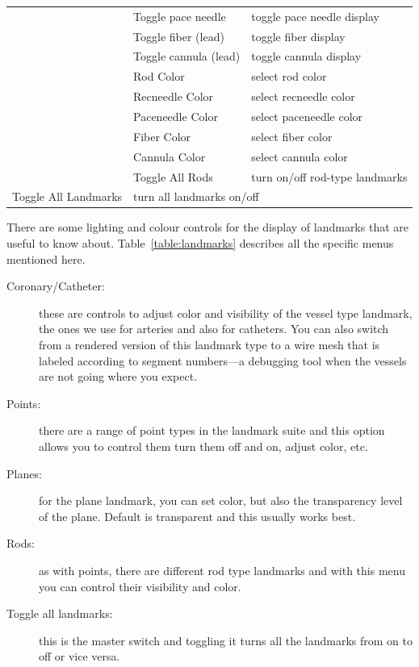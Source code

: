 \begin{table}[ht]
\begin{center}
\begin{tabular}{|l|p{1.5in}|p{3 in}|}
    & Toggle pace needle & toggle pace needle display \\ 
    & Toggle fiber (lead) & toggle fiber display \\ 
    & Toggle cannula (lead) & toggle cannula display \\ 
    & Rod Color & select rod color \\
    & Recneedle Color & select recneedle color \\
    & Paceneedle Color & select paceneedle color \\
    & Fiber Color & select fiber color \\
    & Cannula Color & select cannula color \\
    & Toggle All Rods & turn on/off rod-type landmarks \\ \hline
    Toggle All Landmarks & \multicolumn{2}{|l|}{turn all landmarks on/off} \\
    \hline
    \end{tabular}
  \end{center}
\end{table}

There are some lighting and colour controls for the display of landmarks
that are useful to know about.  Table~\ref{table:landmarks} describes all
the specific menus mentioned here.

\begin{description}
  \item [Coronary/Catheter: ] these are controls to adjust color and
        visibility of the vessel type landmark, the ones we use for
        arteries and also for catheters.  You can also switch from a
        rendered version of this landmark type to a wire mesh that is
        labeled according to segment numbers---a debugging tool when the
        vessels are not going where you expect.
  \item [Points: ] there are a range of point types in the landmark suite
        and this option allows you to control them turn them off and on,
        adjust color, etc.
  \item [Planes: ] for the plane landmark, you can set color, but also the
        transparency level of the plane.  Default is transparent and this
        usually works best.
  \item [Rods: ] as with points, there are different rod type landmarks and
        with this menu you can control their visibility and color.
  \item [Toggle all landmarks: ] this is the master switch and toggling it
        turns all the landmarks from on to off or vice versa.

\end{description}


